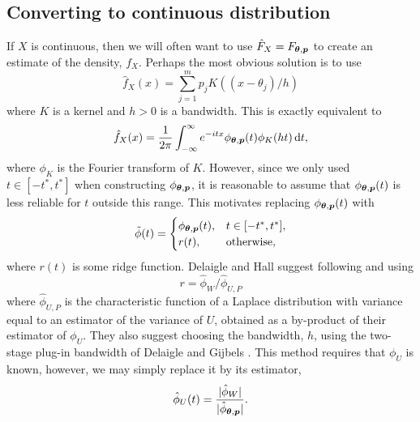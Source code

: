 	\subsection{Converting to continuous distribution}

	If $X$ is continuous, then we will often want to use $\hat{F}_X = F_{{\bm{{\theta}}}, {\bm{{p}}}}$ to create an estimate of the density, $f_X$. Perhaps the most obvious solution is to use
	\begin{equation}
		\hat{f}_X(x) = \sum_{j=1}^m p_j K((x - \theta_j)/h)
	\end{equation}
	where $K$ is a kernel and $h > 0$ is a bandwidth. This is exactly equivalent to 
	\begin{equation}
		\hat{f}_X(x) = \frac{1}{2\pi}\int_{-\infty}^{\infty} e^{-itx} \phi_{{\bm{{\theta}}}, {\bm{{p}}}}(t) \phi_K(ht) \, \mathrm{d} t,
	\end{equation}
	where $\phi_K$ is the Fourier transform of $K$. However, since we only used $t \in [-t^*, t^*]$ when constructing $\phi_{{\bm{{\theta}}}, {\bm{{p}}}}$, it is reasonable to assume that $\phi_{{\bm{{\theta}}}, {\bm{{p}}}}(t)$ is less reliable for $t$ outside this range. This motivates replacing $\phi_{{\bm{{\theta}}}, {\bm{{p}}}}(t)$ with
	\begin{equation}
		\tilde{\phi}(t) = 
		\begin{cases}
			\phi_{{\bm{{\theta}}}, {\bm{{p}}}}(t), & t \in [-t^*, t^*],\\
			r(t), & \text{otherwise},
		\end{cases}
	\end{equation}
	where $r(t)$ is some ridge function. Delaigle and Hall \cite{Delaigle2016-la} suggest following \cite{Delaigle2008-hl} and using
	\begin{equation}
		r = \hat{\phi}_W / \hat{\phi}_{U,P}
	\end{equation}
	where $\hat{\phi}_{U,P}$ is the characteristic function of a Laplace distribution with variance equal to an estimator of the variance of $U$, obtained as a by-product of their estimator of $\phi_U$. They also suggest choosing the bandwidth, $h$, using the two-stage plug-in bandwidth of Delaigle and Gijbels \cite{Delaigle2002-pa} \cite{Delaigle2004-fy}. This method requires that $\phi_U$ is known, however, we may simply replace it by its estimator,
	\begin{equation}
		\hat{\phi}_U(t) = \frac{|\hat{\phi}_W|}{|\hat{\phi}_{{\bm{{\theta}}},{\bm{{p}}}}|}.
	\end{equation}

